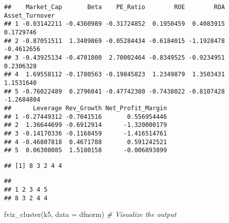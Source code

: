 \documentclass[
]{article}
\newenvironment{Shaded}{\begin{snugshade}}{\end{snugshade}}
\newcommand{\AttributeTok}[1]{\textcolor[rgb]{0.77,0.63,0.00}{#1}}
\newcommand{\CommentTok}[1]{\textcolor[rgb]{0.56,0.35,0.01}{\textit{#1}}}
\newcommand{\DocumentationTok}[1]{\textcolor[rgb]{0.56,0.35,0.01}{\textbf{\textit{#1}}}}
\newcommand{\FunctionTok}[1]{\textcolor[rgb]{0.00,0.00,0.00}{#1}}
\newcommand{\NormalTok}[1]{#1}
\newcommand{\SpecialCharTok}[1]{\textcolor[rgb]{0.00,0.00,0.00}{#1}}
\begin{document}
\begin{Shaded}
\end{Shaded}

\begin{verbatim}
##    Market_Cap       Beta    PE_Ratio        ROE        ROA Asset_Turnover
## 1 -0.03142211 -0.4360989 -0.31724852  0.1950459  0.4083915      0.1729746
## 2 -0.87051511  1.3409869 -0.05284434 -0.6184015 -1.1928478     -0.4612656
## 3 -0.43925134 -0.4701800  2.70002464 -0.8349525 -0.9234951      0.2306328
## 4  1.69558112 -0.1780563 -0.19845823  1.2349879  1.3503431      1.1531640
## 5 -0.76022489  0.2796041 -0.47742380 -0.7438022 -0.8107428     -1.2684804
##      Leverage Rev_Growth Net_Profit_Margin
## 1 -0.27449312 -0.7041516       0.556954446
## 2  1.36644699 -0.6912914      -1.320000179
## 3 -0.14170336 -0.1168459      -1.416514761
## 4 -0.46807818  0.4671788       0.591242521
## 5  0.06308085  1.5180158      -0.006893899
\end{verbatim}

\begin{Shaded}
\end{Shaded}

\begin{verbatim}
## [1] 8 3 2 4 4
\end{verbatim}

\begin{Shaded}
\end{Shaded}

\begin{verbatim}
## 
## 1 2 3 4 5 
## 8 3 2 4 4
\end{verbatim}

\begin{Shaded}
\begin{Highlighting}[]
\FunctionTok{fviz\_cluster}\NormalTok{(k5, }\AttributeTok{data =}\NormalTok{ dfnorm) }\CommentTok{\# Visualize the output}
\end{Highlighting}
\end{Shaded}
\end{document}
